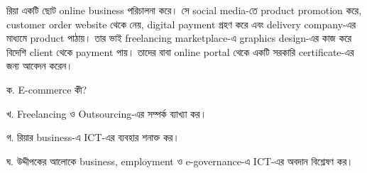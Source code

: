 \begin{topicbody}
রিয়া একটি ছোট online business পরিচালনা করে। সে social media-তে product promotion করে, customer order website থেকে নেয়, digital payment গ্রহণ করে এবং delivery company-এর মাধ্যমে product পাঠায়। তার ভাই freelancing marketplace-এ graphics design-এর কাজ করে বিদেশি client থেকে payment পায়। তাদের বাবা online portal থেকে একটি সরকারি certificate-এর জন্য আবেদন করেন।

\begin{compactenum}
\item ক. E-commerce কী?
\item খ. Freelancing ও Outsourcing-এর সম্পর্ক ব্যাখ্যা কর।
\item গ. রিয়ার business-এ ICT-এর ব্যবহার শনাক্ত কর।
\item ঘ. উদ্দীপকের আলোকে business, employment ও e-governance-এ ICT-এর অবদান বিশ্লেষণ কর।
\end{compactenum}


\end{topicbody}
